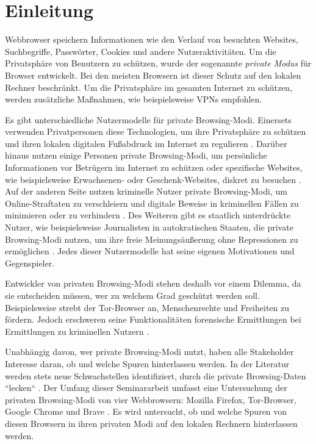 \chapter{Einleitung}
Webbrowser speichern Informationen wie den Verlauf von besuchten Websites, Suchbegriffe, Passwörter, Cookies und andere Nutzeraktivitäten. 
Um die Privatsphäre von Benutzern zu schützen, wurde der sogenannte \textit{private Modus} für Browser entwickelt.
Bei den meisten Browsern ist dieser Schutz auf den lokalen Rechner beschränkt. \cite{Rochmadi.2017} Um die Privatsphäre im gesamten Internet zu schützen, werden zusätzliche Maßnahmen, wie beispielsweise VPNs empfohlen. \cite{Perdices.2023}

Es gibt unterschiedliche Nutzermodelle für private Browsing-Modi. Einersets verwenden Privatpersonen diese Technologien, um ihre Privatsphäre zu schützen und ihren lokalen digitalen Fußabdruck im Internet zu regulieren \cite{Horsman.2019}. Darüber hinaus nutzen einige Personen private Browsing-Modi, um persönliche Informationen vor Betrügern im Internet zu schützen oder spezifische Websites, wie beispielsweise Erwachsenen- oder Geschenk-Websites, diskret zu besuchen \cite{Aggarwal.2010}. Auf der anderen Seite nutzen kriminelle Nutzer private Browsing-Modi, um Online-Straftaten zu verschleiern und digitale Beweise in kriminellen Fällen zu minimieren oder zu verhindern \cite{Montasari.2015, Rochmadi.2017}. Des Weiteren gibt es staatlich unterdrückte Nutzer, wie beispielsweise Journalisten in autokratischen Staaten, die private Browsing-Modi nutzen, um ihre freie Meinungsäußerung ohne Repressionen zu ermöglichen \cite{Rathod.2017}. Jedes dieser Nutzermodelle hat seine eigenen Motivationen und Gegenspieler.

Entwickler von privaten Browsing-Modi stehen deshalb vor einem Dilemma, da sie entscheiden müssen, wer zu welchem Grad geschützt werden soll. Beispielsweise strebt der Tor-Browser an, Menschenrechte und Freiheiten zu fördern. \cite{Tor.24.05.2023}
Jedoch erschweren seine Funktionalitäten forensische Ermittlungen bei Ermittlungen zu kriminellen Nutzern \cite{Muir.2019, Rathod.2017}.

Unabhängig davon, wer private Browsing-Modi nutzt, haben alle Stakeholder Interesse daran, ob und welche Spuren hinterlassen werden. In der Literatur werden stets neue Schwachstellen identifiziert, durch die private Browsing-Daten ``lecken`` \cite{Satvat.2014}.
Der Umfang dieser Seminararbeit umfasst eine Untersuchung der privaten Browsing-Modi von vier Webbrowsern: Mozilla Firefox, Tor-Browser, Google Chrome und Brave \cite{Montasari.2015}. Es wird untersucht, ob und welche Spuren von diesen Browsern in ihren privaten Modi auf den lokalen Rechnern hinterlassen werden.

